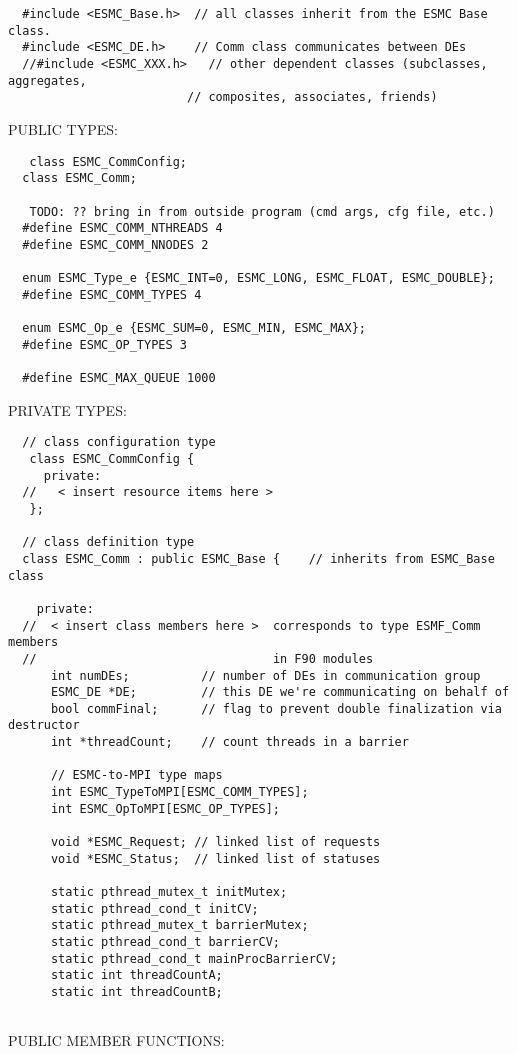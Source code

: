 \begin{verbatim}  #include <ESMC_Base.h>  // all classes inherit from the ESMC Base class.
  #include <ESMC_DE.h>    // Comm class communicates between DEs
  //#include <ESMC_XXX.h>   // other dependent classes (subclasses, aggregates,
                         // composites, associates, friends)
 \end{verbatim}{\sf PUBLIC TYPES:}
\begin{verbatim}   class ESMC_CommConfig;
  class ESMC_Comm;
 
   TODO: ?? bring in from outside program (cmd args, cfg file, etc.)
  #define ESMC_COMM_NTHREADS 4
  #define ESMC_COMM_NNODES 2
 
  enum ESMC_Type_e {ESMC_INT=0, ESMC_LONG, ESMC_FLOAT, ESMC_DOUBLE};
  #define ESMC_COMM_TYPES 4
 
  enum ESMC_Op_e {ESMC_SUM=0, ESMC_MIN, ESMC_MAX};
  #define ESMC_OP_TYPES 3
 
  #define ESMC_MAX_QUEUE 1000
 \end{verbatim}{\sf PRIVATE TYPES:}
\begin{verbatim} 
  // class configuration type
   class ESMC_CommConfig {
     private:
  //   < insert resource items here >
   };
 
  // class definition type
  class ESMC_Comm : public ESMC_Base {    // inherits from ESMC_Base class
 
    private:
  //  < insert class members here >  corresponds to type ESMF_Comm members
  //                                 in F90 modules
      int numDEs;          // number of DEs in communication group
      ESMC_DE *DE;         // this DE we're communicating on behalf of
      bool commFinal;      // flag to prevent double finalization via destructor
      int *threadCount;    // count threads in a barrier
 
      // ESMC-to-MPI type maps
      int ESMC_TypeToMPI[ESMC_COMM_TYPES];
      int ESMC_OpToMPI[ESMC_OP_TYPES];
 
      void *ESMC_Request; // linked list of requests
      void *ESMC_Status;  // linked list of statuses
 
      static pthread_mutex_t initMutex;
      static pthread_cond_t initCV;
      static pthread_mutex_t barrierMutex;
      static pthread_cond_t barrierCV;
      static pthread_cond_t mainProcBarrierCV;
      static int threadCountA;
      static int threadCountB;
 
 \end{verbatim}{\sf PUBLIC MEMBER FUNCTIONS:}
